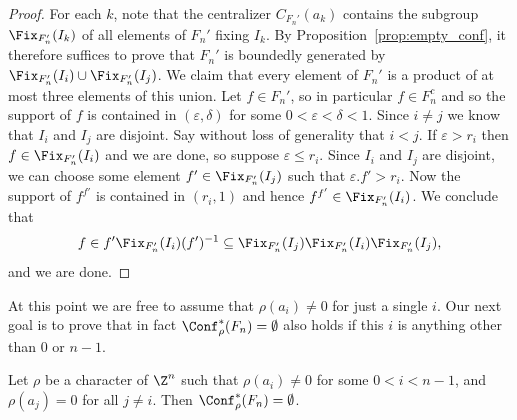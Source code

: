 \begin{proof}
For each $k$, note that the centralizer $C_{F_n'}(a_k)$ contains the subgroup $\Fix_{F_n'}(I_k)$ of all elements of $F_n'$ fixing $I_k$. By Proposition~\ref{prop:empty_conf}, it therefore suffices to prove that $F_n'$ is boundedly generated by $\Fix_{F_n'}(I_i)\cup \Fix_{F_n'}(I_j)$. We claim that every element of $F_n'$ is a product of at most three elements of this union.
Let $f\in F_n'$, so in particular $f \in F_n^c$ and so the support of $f$ is contained in $(\varepsilon,\delta)$ for some $0<\varepsilon<\delta<1$. Since $i\ne j$ we know that $I_i$ and $I_j$ are disjoint. Say without loss of generality that $i<j$. If $\varepsilon>r_i$ then $f\in \Fix_{F_n'}(I_i)$ and we are done, so suppose $\varepsilon\le r_i$. Since $I_i$ and $I_j$ are disjoint, we can choose some element $f'\in \Fix_{F_n'}(I_j)$ such that $\varepsilon.f'>r_i$. Now the support of $f^{f'}$ is contained in $(r_i,1)$ and hence $f^{f'}\in\Fix_{F_n'}(I_i)$. We conclude that
\[
f\in f'\Fix_{F_n'}(I_i)(f')^{-1} \subseteq \Fix_{F_n'}(I_j)\Fix_{F_n'}(I_i)\Fix_{F_n'}(I_j)\text{,}
\] and we are done.
\end{proof}

At this point we are free to assume that $\rho(a_i)\ne 0$ for just a single $i$. Our next goal is to prove that in fact $\Conf^\ast_\rho(F_n)=\emptyset$ also holds if this $i$ is anything other than $0$ or $n-1$.

\begin{prop}\label{prop:middle_empty_conf}
Let $\rho$ be a character of $\Z^n$ such that $\rho(a_i)\ne 0$ for some $0<i<n-1$, and $\rho(a_j)=0$ for all $j\ne i$. Then $\Conf^\ast_\rho(F_n)=\emptyset$.
\end{prop}


